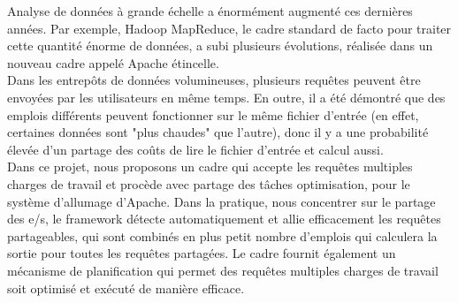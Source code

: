 \documentclass[13pt, oneside]{Thesis} %
\begin{document}
{{Analyse de données à grande échelle a énormément augmenté ces dernières années. Par exemple, Hadoop MapReduce, le cadre standard de facto pour traiter cette quantité énorme de données, a subi plusieurs évolutions, réalisée dans un nouveau cadre appelé Apache étincelle.\\
Dans les entrepôts de données volumineuses, plusieurs requêtes peuvent être envoyées par les utilisateurs en même temps. En outre, il a été démontré que des emplois différents peuvent fonctionner sur le même fichier d'entrée (en effet, certaines données sont "plus chaudes" que l'autre), donc il y a une probabilité élevée d'un partage des coûts de lire le fichier d'entrée et calcul aussi.\\
Dans ce projet, nous proposons un cadre qui accepte les requêtes multiples charges de travail et procède avec partage des tâches optimisation, pour le système d'allumage d'Apache. Dans la pratique, nous concentrer sur le partage des e/s, le framework détecte automatiquement et allie efficacement les requêtes partageables, qui sont combinés en plus petit nombre d'emplois qui calculera la sortie pour toutes les requêtes partagées. Le cadre fournit également un mécanisme de planification qui permet des requêtes multiples charges de travail soit optimisé et exécuté de manière efficace.\\
}

\clearpage %



}
\end{document}
